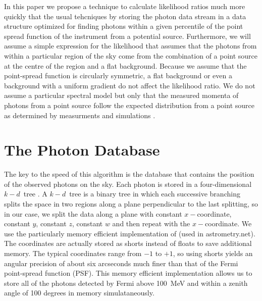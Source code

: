 \documentclass[useAMS,usenatbib]{mn2e}
\begin{document}
In this paper we propose a technique to calculate likelihood ratios
much more quickly that the usual tehcniques by storing the photon data
stream in a data structure optimized for finding photons within a
given percentile of the point spread function of the instrument from a
potential source.  Furthermore, we will assume a simple expression for
the likelihood that assumes that the photons from within a particular
region of the sky come from the combination of a point source at the
centre of the region and a flat background.  Because we assume that
the point-spread function is circularly symmetric, a flat background
or even a background with a uniform gradient do not affect the
likelihood ratio. We do not assume a particular spectral model but
only that the measured momenta of photons from a point source follow
the expected distribution from a point source as determined by
measurments and simulations \citep{2013ApJ...765...54A}.

\section{The Photon Database}
\label{sec:photon-database}

The key to the speed of this algorithm is the database that contains
the position of the observed photons on the sky.  Each photon is
stored in a four-dimensional $k-d$~tree
\citep{Bentley:1975:MBS:361002.361007}.  A $k-d$~tree is a binary tree
in which each successive branching splits the space in two regions
along a plane perpendicular to the last splitting, so in our case, we
split the data along a plane with constant $x-$coordinate, constant
$y$, constant $z$, constant $w$ and then repeat with the
$x-$coordinate.  We use the particularly memory efficient
implementation of \citet{LangPhD} (used in astrometry.net).  The
coordinates are actually stored as shorts instead of floats to save
additional memory.  The typical coordinates range from $-1$ to $+1$,
so using shorts yields an angular precision of about six arcseconds
much finer than that of the Fermi point-spread function (PSF).  This
memory efficient implementation allows us to store all of the photons
detected by Fermi above 100~MeV and within a zenith angle of 100
degrees in memory simulataneously.
\end{document}
